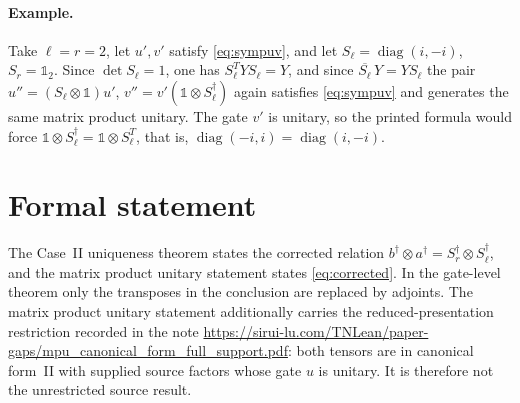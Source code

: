 \documentclass{article}
\begin{document}
\paragraph{Example.} Take $\ell=r=2$, let $u',v'$ satisfy \eqref{eq:sympuv},
and let $S_\ell=\operatorname{diag}(i,-i)$, $S_r=\mathbb 1_2$. Since
$\det S_\ell=1$, one has $S_\ell^TYS_\ell=Y$, and since
$\overline{S_\ell}\,Y=YS_\ell$ the pair
$u''=(S_\ell\otimes\mathbb 1)u'$, $v''=v'(\mathbb 1\otimes S_\ell^\dagger)$
again satisfies \eqref{eq:sympuv} and generates the same matrix product
unitary. The gate $v'$ is unitary, so the printed formula would force
$\mathbb 1\otimes S_\ell^\dagger=\mathbb 1\otimes S_\ell^T$, that is,
$\operatorname{diag}(-i,i)=\operatorname{diag}(i,-i)$.

\section{Formal statement}

The Case~II uniqueness theorem
 states the corrected
relation $b^\dagger\otimes a^\dagger=S_r^\dagger\otimes S_\ell^\dagger$, and
the matrix product unitary statement
states \eqref{eq:corrected}. In the gate-level theorem only the transposes in
the conclusion are replaced by adjoints. The matrix product unitary statement
additionally carries the reduced-presentation restriction recorded in
the note
\url{https://sirui-lu.com/TNLean/paper-gaps/mpu_canonical_form_full_support.pdf}: both tensors are in canonical
form~II with supplied source factors whose gate $u$ is unitary. It is
therefore not the unrestricted source result.



\end{document}
